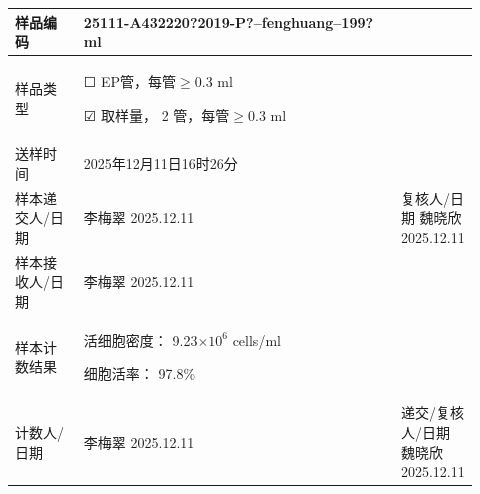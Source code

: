 \documentclass[UTF8,10pt,a4paper,fontset=fandol]{ctexart}
\newcommand{\fieldvalue}[1]{#1}
\newcommand{\handwritten}[1]{#1}
\newcommand{\checkboxfield}[1]{\ifstrequal{#1}{checked}{☑}{\ifstrequal{#1}{unclear}{?}{☐}}}
\begin{document}
\begin{center}
\begin{tabular}{|p{0.16\linewidth}|p{0.76\linewidth}|}
\hline
\centering 样品编码 &
\fieldvalue{\handwritten{25111-A432220?2019-P?--fenghuang--199? ml}}
\\ \hline
\centering 样品类型 &
\fieldvalue{\checkboxfield{unchecked}} EP管，每管$\geq 0.3$ ml
\par
\fieldvalue{\checkboxfield{checked}} 取样量，
\fieldvalue{\handwritten{2}} 管，每管$\geq 0.3$ ml
\\ \hline
\centering 送样时间 &
\fieldvalue{\handwritten{2025年12月11日16时26分}}
\\ \hline
\centering 样本递交人/日期 &
\fieldvalue{\handwritten{李梅翠}}
\quad
\fieldvalue{\handwritten{2025.12.11}}
&
复核人/日期\quad
\fieldvalue{\handwritten{魏晓欣}}
\quad
\fieldvalue{\handwritten{2025.12.11}}
\\ \hline
\centering 样本接收人/日期 &
\fieldvalue{\handwritten{李梅翠}}
\quad
\fieldvalue{\handwritten{2025.12.11}}
\\ \hline
\centering 样本计数结果 &
活细胞密度：
\fieldvalue{\handwritten{9.23}}\(\times10^{6}\) cells/ml
\par
细胞活率：
\fieldvalue{\handwritten{97.8}}\%
\\ \hline
\centering 计数人/日期 &
\fieldvalue{\handwritten{李梅翠}}
\quad
\fieldvalue{\handwritten{2025.12.11}}
&
递交/复核人/日期\quad
\fieldvalue{\handwritten{魏晓欣}}
\quad
\fieldvalue{\handwritten{2025.12.11}}
\\ \hline
\end{tabular}
\end{center}
\end{document}
